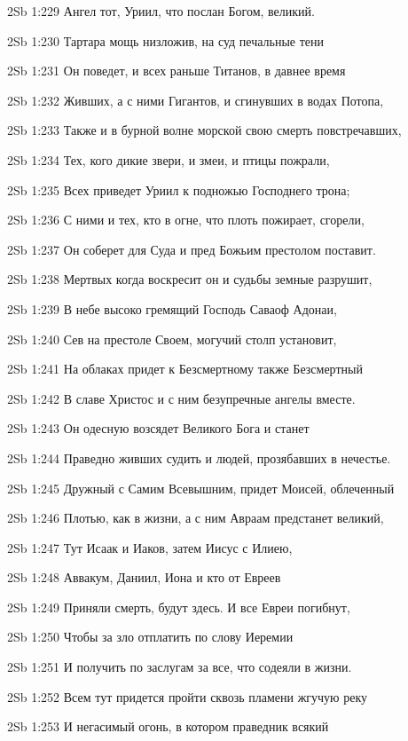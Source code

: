 \vs 2Sb 1:229 Ангел тот, Уриил, что послан Богом, великий.

\vs 2Sb 1:230 Тартара мощь низложив, на суд печальные тени 

\vs 2Sb 1:231 Он поведет, и всех раньше Титанов, в давнее время 

\vs 2Sb 1:232 Живших, а с ними Гигантов, и сгинувших в водах Потопа, 

\vs 2Sb 1:233 Также и в бурной волне морской свою смерть повстречавших, 

\vs 2Sb 1:234 Тех, кого дикие звери, и змеи, и птицы пожрали, 

\vs 2Sb 1:235 Всех приведет Уриил к подножью Господнего трона; 

\vs 2Sb 1:236 С ними и тех, кто в огне, что плоть пожирает, сгорели, 

\vs 2Sb 1:237 Он соберет для Суда и пред Божьим престолом поставит.

\vs 2Sb 1:238 Мертвых когда воскресит он и судьбы земные разрушит, 

\vs 2Sb 1:239 В небе высоко гремящий Господь Саваоф Адонаи,

\vs 2Sb 1:240 Сев на престоле Своем, могучий столп установит, 

\vs 2Sb 1:241 На облаках придет к Безсмертному также Безсмертный 

\vs 2Sb 1:242 В славе Христос и с ним безупречные ангелы вместе. 

\vs 2Sb 1:243 Он одесную возсядет Великого Бога и станет 

\vs 2Sb 1:244 Праведно живших судить и людей, прозябавших в нечестье.

\vs 2Sb 1:245 Дружный с Самим Всевышним, придет Моисей, облеченный

\vs 2Sb 1:246 Плотью, как в жизни, а с ним Авраам предстанет великий, 

\vs 2Sb 1:247 Тут Исаак и Иаков, затем Иисус с Илиею,

\vs 2Sb 1:248 Аввакум, Даниил, Иона и кто от Евреев 

\vs 2Sb 1:249 Приняли смерть, будут здесь. И все Евреи погибнут,

\vs 2Sb 1:250 Чтобы за зло отплатить по слову Иеремии

\vs 2Sb 1:251 И получить по заслугам за все, что содеяли в жизни. 

\vs 2Sb 1:252 Всем тут придется пройти сквозь пламени жгучую реку 

\vs 2Sb 1:253 И негасимый огонь, в котором праведник всякий 

